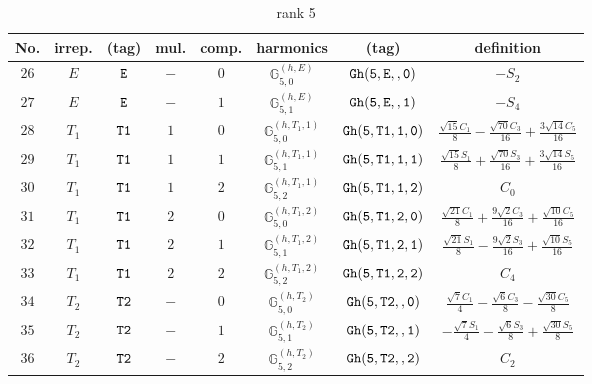 \documentclass[fleqn,8pt]{jsarticle}
\begin{document}
\begin{table}[ht!]
\begin{center}
\caption{rank 5}
\renewcommand{\arraystretch}{1.3}
\begin{tabular}{cccccccc} \hline \hline
No. & irrep. & (tag) & mul. & comp. & harmonics & (tag) & definition \\ \hline
$ 26 $ & $ E $ & $ {\tt E} $ & $ - $ & $ 0 $ & $ \mathbb{G}_{5,0}^{(h,E)} $ & $ {\tt Gh(5,E,,0)} $ & $ - S_{2} $ \\
$ 27 $ & $ E $ & $ {\tt E} $ & $ - $ & $ 1 $ & $ \mathbb{G}_{5,1}^{(h,E)} $ & $ {\tt Gh(5,E,,1)} $ & $ - S_{4} $ \\
$ 28 $ & $ T_{1} $ & $ {\tt T1} $ & $ 1 $ & $ 0 $ & $ \mathbb{G}_{5,0}^{(h,T_{1},1)} $ & $ {\tt Gh(5,T1,1,0)} $ & $ \frac{\sqrt{15} C_{1}}{8} - \frac{\sqrt{70} C_{3}}{16} + \frac{3 \sqrt{14} C_{5}}{16} $ \\
$ 29 $ & $ T_{1} $ & $ {\tt T1} $ & $ 1 $ & $ 1 $ & $ \mathbb{G}_{5,1}^{(h,T_{1},1)} $ & $ {\tt Gh(5,T1,1,1)} $ & $ \frac{\sqrt{15} S_{1}}{8} + \frac{\sqrt{70} S_{3}}{16} + \frac{3 \sqrt{14} S_{5}}{16} $ \\
$ 30 $ & $ T_{1} $ & $ {\tt T1} $ & $ 1 $ & $ 2 $ & $ \mathbb{G}_{5,2}^{(h,T_{1},1)} $ & $ {\tt Gh(5,T1,1,2)} $ & $ C_{0} $ \\
$ 31 $ & $ T_{1} $ & $ {\tt T1} $ & $ 2 $ & $ 0 $ & $ \mathbb{G}_{5,0}^{(h,T_{1},2)} $ & $ {\tt Gh(5,T1,2,0)} $ & $ \frac{\sqrt{21} C_{1}}{8} + \frac{9 \sqrt{2} C_{3}}{16} + \frac{\sqrt{10} C_{5}}{16} $ \\
$ 32 $ & $ T_{1} $ & $ {\tt T1} $ & $ 2 $ & $ 1 $ & $ \mathbb{G}_{5,1}^{(h,T_{1},2)} $ & $ {\tt Gh(5,T1,2,1)} $ & $ \frac{\sqrt{21} S_{1}}{8} - \frac{9 \sqrt{2} S_{3}}{16} + \frac{\sqrt{10} S_{5}}{16} $ \\
$ 33 $ & $ T_{1} $ & $ {\tt T1} $ & $ 2 $ & $ 2 $ & $ \mathbb{G}_{5,2}^{(h,T_{1},2)} $ & $ {\tt Gh(5,T1,2,2)} $ & $ C_{4} $ \\
$ 34 $ & $ T_{2} $ & $ {\tt T2} $ & $ - $ & $ 0 $ & $ \mathbb{G}_{5,0}^{(h,T_{2})} $ & $ {\tt Gh(5,T2,,0)} $ & $ \frac{\sqrt{7} C_{1}}{4} - \frac{\sqrt{6} C_{3}}{8} - \frac{\sqrt{30} C_{5}}{8} $ \\
$ 35 $ & $ T_{2} $ & $ {\tt T2} $ & $ - $ & $ 1 $ & $ \mathbb{G}_{5,1}^{(h,T_{2})} $ & $ {\tt Gh(5,T2,,1)} $ & $ - \frac{\sqrt{7} S_{1}}{4} - \frac{\sqrt{6} S_{3}}{8} + \frac{\sqrt{30} S_{5}}{8} $ \\
$ 36 $ & $ T_{2} $ & $ {\tt T2} $ & $ - $ & $ 2 $ & $ \mathbb{G}_{5,2}^{(h,T_{2})} $ & $ {\tt Gh(5,T2,,2)} $ & $ C_{2} $ \\
 \hline \hline
\end{tabular}
\end{center}
\end{table}
\end{document}

